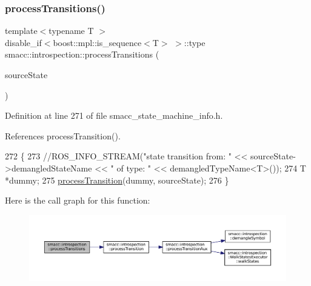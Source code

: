 \subsubsection{\texorpdfstring{process\+Transitions()}{processTransitions()}\hspace{0.1cm}{\footnotesize\ttfamily [2/2]}}
{\footnotesize\ttfamily template$<$typename T $>$ \\
disable\+\_\+if$<$boost\+::mpl\+::is\+\_\+sequence$<$T$>$ $>$\+::type smacc\+::introspection\+::process\+Transitions (\begin{DoxyParamCaption}\item[{std\+::shared\+\_\+ptr$<$ \hyperlink{classsmacc_1_1introspection_1_1SmaccStateInfo}{Smacc\+State\+Info} $>$ \&}]{source\+State }\end{DoxyParamCaption})}



Definition at line 271 of file smacc\+\_\+state\+\_\+machine\+\_\+info.\+h.



References process\+Transition().


\begin{DoxyCode}
272 \{
273     \textcolor{comment}{//ROS\_INFO\_STREAM("state transition from: " << sourceState->demangledStateName << " of type: " <<
       demangledTypeName<T>());}
274     T *dummy;
275     \hyperlink{namespacesmacc_1_1introspection_a25f60bf498ae9f3d0324ed1b84ecbae4}{processTransition}(dummy, sourceState);
276 \}
\end{DoxyCode}
Here is the call graph for this function\+:
\nopagebreak
\begin{figure}[H]
\begin{center}
\leavevmode
\includegraphics[width=350pt]{namespacesmacc_1_1introspection_a24beffddf95fa3dce92051b336e65d8f_cgraph}
\end{center}
\end{figure}
\mbox{\label{namespacesmacc_1_1introspection_a48571b9bf3b115d2a83cc0147c96d0bd}} 

